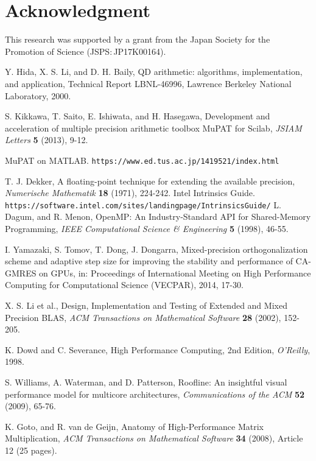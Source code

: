 \documentclass{IOS-Book-Article}
\begin{document}
\section*{Acknowledgment}

This research was supported by a grant from the Japan Society for the Promotion of Science (JSPS$\colon$JP17K00164).
\begin{thebibliography}{99}
 Y. Hida, X. S. Li, and D. H. Baily, QD arithmetic: algorithms, implementation, and application, Technical Report LBNL-46996, Lawrence Berkeley National Laboratory, 2000.

 S. Kikkawa, T. Saito, E. Ishiwata, and H. Hasegawa, Development and acceleration of multiple precision arithmetic toolbox MuPAT for Scilab, {\it JSIAM Letters} {\bf 5} (2013), 9-12. 

 MuPAT on MATLAB. {\tt https://www.ed.tus.ac.jp/1419521/index.html}

 T. J. Dekker, A floating-point technique for extending the available precision, {\it Numerische Mathematik} {\bf 18} (1971), 224-242. 
 Intel Intrinsics Guide. {\tt https://software.intel.com/sites/landingpage/IntrinsicsGuide/}
 L. Dagum, and R. Menon, OpenMP: An Industry-Standard API for Shared-Memory Programming, {\it IEEE Computational Science \& Engineering} {\bf 5} (1998), 46-55. 

I. Yamazaki, S. Tomov, T. Dong, J. Dongarra, Mixed-precision orthogonalization scheme and adaptive step size for improving the stability and performance of CA-GMRES on GPUs, in: Proceedings of International Meeting on High Performance Computing for Computational Science (VECPAR), 2014, 17-30.

 X. S. Li et al., Design, Implementation and Testing of Extended and Mixed Precision BLAS, {\it ACM Transactions on Mathematical Software} {\bf 28} (2002), 152-205.

 K. Dowd and C. Severance, High Performance Computing, 2nd Edition, {\it O'Reilly}, 1998.

 S. Williams, A. Waterman, and D. Patterson, Roofline: An insightful visual performance model for multicore architectures, {\it Communications of the ACM} {\bf 52} (2009),  65-76.

 K. Goto, and R. van de Geijn, Anatomy of High-Performance Matrix Multiplication, {\it ACM Transactions on Mathematical Software} {\bf 34} (2008), Article 12 (25 pages).

\end{thebibliography}
\end{document}
